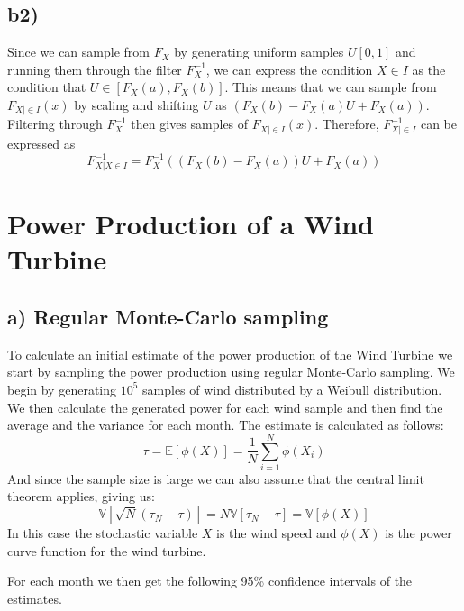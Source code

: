\documentclass[a4paper]{article}
\begin{document}
\subsection*{b2)}
Since we can sample from $F_X$ by generating uniform samples $U[0,1]$ and running them through the filter $F_X^{-1}$, we can express the condition $X \in I$ as the condition that $U \in [F_X(a), F_X(b)]$. This means that we can sample from $F_{X|\in{I}}(x)$ by scaling and shifting $U$ as $(F_X(b) - F_X(a)U + F_X(a))$. Filtering through $F_X^{-1}$ then gives samples of $F_{X|\in I}(x)$.
Therefore, $F_{X| \in I}^{-1}$ can be expressed as 
\begin{equation}
    F_{X|X\in I}^{-1} = F_X^{-1}((F_X(b) - F_X(a))U + F_X(a))
\end{equation}

\newpage
\section*{Power Production of a Wind Turbine}

\subsection*{a) Regular Monte-Carlo sampling}
To calculate an initial estimate of the power production of the Wind Turbine we start by sampling the power production using regular Monte-Carlo sampling. We begin by generating $10^5$ samples of wind distributed by a Weibull distribution. We then calculate the generated power for each wind sample and then find the average and the variance for each month. The estimate is calculated as follows:
\begin{equation}
    \tau = \mathbb{E}[\phi(X)] = \frac{1}{N}\sum_{i = 1}^N\phi(X_i)
\end{equation}
And since the sample size is large we can also assume that the central limit theorem applies, giving us:
\begin{equation}
    \mathbb{V}[\sqrt{N}(\tau_N-\tau)] = N\mathbb{V}[\tau_N-\tau] = \mathbb{V}[\phi(X)]
\end{equation}
In this case the stochastic variable $X$ is the wind speed and $\phi(X)$ is the power curve function for the wind turbine.

For each month we then get the following 95\% confidence intervals of the estimates.
\end{document}
